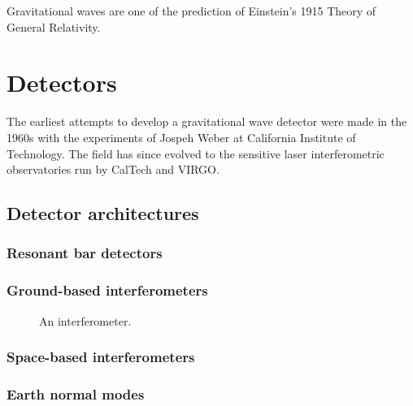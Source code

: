 \documentclass{kentigern}
\begin{document}
Gravitational waves are one of the prediction of Einstein's 1915 Theory of General Relativity.

\chapter{Detectors}
\label{cha:detectors}


The earliest attempts to develop a gravitational wave detector were
made in the 1960s with the experiments of Jospeh Weber at California
Institute of Technology. The field has since evolved to the sensitive
laser interferometric observatories run by CalTech and VIRGO.

\section{Detector architectures}
\label{sec:detect-arch}

\subsection{Resonant bar detectors}
\label{sec:reson-bar-detect}

\subsection{Ground-based interferometers}
\label{sec:ground-based-interf}

\begin{figure*}
\begin{adjustwidth*}{-5.5in}{-2in}
  \centering
  
  \caption{An interferometer.}
  \label{fig:interferometer}
\end{adjustwidth*}
\end{figure*}

\subsection{Space-based interferometers}
\label{sec:space-based-interf}

\subsection{Earth normal modes}
\label{sec:earth-normal-modes}
\end{document}
